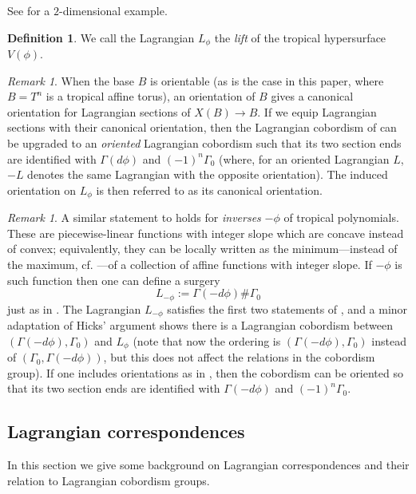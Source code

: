 \documentclass[10pt]{amsart}
\theoremstyle{definition}
\newtheorem{definition}[thm]{Definition}
\theoremstyle{remark}
\newtheorem{remark}[thm]{Remark}
\begin{document}
See  for a $2$-dimensional example.

\begin{definition}
    We call the Lagrangian $L_\phi$ the \emph{lift} of the tropical hypersurface $V(\phi)$.
\end{definition}

\begin{remark}\label{rmk:orientation}
    When the base $B$ is orientable (as is the case in this paper, where $B = T^n$ is a tropical affine torus), an orientation of $B$ gives a canonical orientation for Lagrangian sections of $X(B) \to B$.
    If we equip Lagrangian sections with their canonical orientation, then the Lagrangian cobordism of  can be upgraded to an \emph{oriented} Lagrangian cobordism such that its two section ends are identified with  $\Gamma(d\phi)$ and $(-1)^n\Gamma_0$ (where, for an oriented Lagrangian $L$, $-{L}$ denotes the same Lagrangian with the opposite orientation).
    The induced orientation on $L_\phi$ is then referred to as its canonical orientation.
\end{remark}
\begin{remark}
    A similar statement to  holds for \emph{inverses} $-\phi$ of tropical polynomials. 
    These are piecewise-linear functions with integer slope which are concave instead of convex; equivalently, they can be locally written as the minimum---instead of the maximum, cf. ---of a collection of affine functions with integer slope.
    If $-\phi$ is such function then one can define a surgery
    $$
    L_{-\phi} := \Gamma(-d\phi)\#\Gamma_0
    $$
    just as in \cite{hicks2020tropical}.
    The Lagrangian $L_{-\phi}$ satisfies the first two statements of , and a minor adaptation of Hicks' argument shows there is a Lagrangian cobordism between $(\Gamma(-d\phi),\Gamma_0)$ and $L_{\phi}$ (note that now the ordering is $(\Gamma(-d\phi),\Gamma_0)$ instead of $(\Gamma_0,\Gamma(-d\phi))$, but this does not affect the relations in the cobordism group).
    If one includes orientations as in , then the cobordism can be oriented so that its two section ends are identified with $\Gamma(-d\phi)$ and $(-1)^n {\Gamma}_0$.
\end{remark}
 \subsection{Lagrangian correspondences}\label{sec:lagrangiancorrespondences}
In this section we give some background on Lagrangian correspondences and their relation to Lagrangian cobordism groups.
\end{document}
